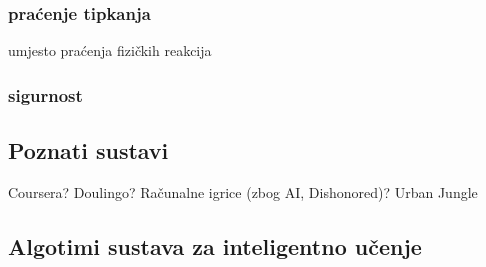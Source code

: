 \documentclass[times, utf8, zavrsni]{fer}
\begin{document}
\subsubsection{praćenje tipkanja}
umjesto praćenja fizičkih reakcija

\subsubsection{sigurnost}

\subsection{Poznati sustavi}
Coursera? Doulingo? Računalne igrice (zbog AI, Dishonored)? Urban Jungle

\subsection{Algotimi sustava za inteligentno učenje}
\end{document}
